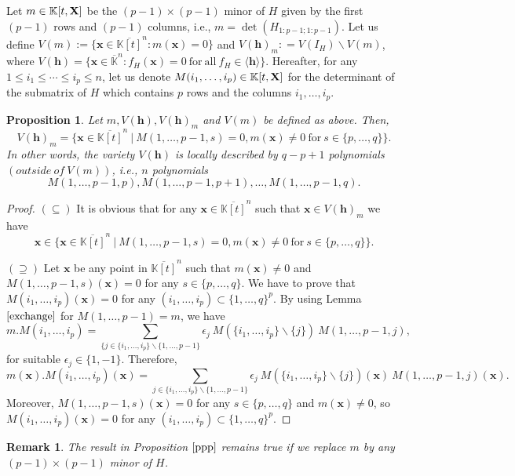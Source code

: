 \documentclass[11pt]{article}
\numberwithin{Property}{section}
\numberwithin{Theorem}{section}
\newtheorem{Proposition}{Proposition}%
\numberwithin{Proposition}{section}
\numberwithin{Lemma}{section}
\numberwithin{Corollary}{section}
\numberwithin{Definition}{section}
\newtheorem{Remark}{Remark}%
\numberwithin{Remark}{section}
\numberwithin{Conjecture}{section}
\numberwithin{Problem}{section}
\numberwithin{Claim}{section}
\theoremstyle{definition}
\numberwithin{Example}{section}
\def\h {\ensuremath{\mathbf{h}}}
\renewcommand{\leq}{\leqslant}
\def\bar{\overline}
\newcommand{\field}{\mathbb{K}} %
\newcommand{\mat}[1]{\mathbf{\MakeUppercase{#1}}} %
\begin{document}
Let $m \in \field[t,\mat{X}]$ be the $(p-1) \times (p-1)$ minor of $H$ given by the first $(p-1)$ rows and $(p-1)$ columns, i.e., $m = \det(H_{1:p-1;1:p-1})$. Let us define $V(m) := \{\mathbf{x} \in \bar{\field[t]}^n : m(\mathbf{x}) = 0\}$ and $V(\h)_m : = V(I_H) \backslash V(m)$, where $V(\h) = \{\mathbf{x} \in \bar{\field}^{n} : f_H(\mathbf{x}) = 0 \ \mathrm{for \ all} \ f_H \in \langle \h \rangle \}$. Hereafter, for any $1 \leq i_1 \leq \cdots \leq i_p \leq n$, let us denote $M(i_1, \ldots, i_p) \in \field[t,\mat{X}]$ for the determinant of the submatrix of $H$ which contains $p$ rows and the columns $i_1, \ldots, i_p$. 
\begin{Proposition} \label{ppp} Let $m, V(\h), V(\h)_m$ and $V(m)$ be defined as above. Then, 
\[
V(\h)_m = \{\mathbf{x} \in \bar{\field[t]}^n \ | \ M(1, \ldots, p-1, s) = 0, m(\mathbf{x}) \ne 0 \ \mathrm{for} \ s \in \{p, \ldots, q\} \}.
\] In other words, the variety $V(\h)$ is locally described by $q - p + 1$ polynomials $(outside \ of \ V(m))$, i.e., $n$ polynomials 
\[
M(1, \ldots, p-1, p), M(1, \ldots, p-1, p+	1), \ldots, M(1, \ldots, p-1, q).
\]
\end{Proposition}
\begin{proof}
$(\subseteq)$ It is obvious that for any $\mathbf{x} \in \bar{\field[t]}^n$ such that $\mathbf{x} \in V(\h)_m$ we have 
\[\mathbf{x} \in \{\mathbf{x} \in \bar{\field[t]}^n \ | \ M(1, \ldots, p-1, s) = 0, m(\mathbf{x}) \ne 0 \ \mathrm{for} \ s \in \{p, \ldots, q\} \}.\]

$(\supseteq)$ Let $\mathbf{x}$ be any point in $\bar{\field[t]}^n$ such that $m(\mathbf{x}) \ne 0$ and $M(1, \ldots, p-1, s)(\mathbf{x}) = 0$ for any $s \in \{p, \ldots, q\}$. We have to prove that $M(i_1, \ldots, i_p)(\mathbf{x}) = 0$ for any $(i_1, \ldots, i_p) \subset \{1, \ldots, q\}^p$. By using Lemma $\ref{exchange}$ for $M(1, \ldots, p-1) = m$, we have 
\[
m.M(i_1, \ldots, i_p) = \sum_{\{j \in \{i_1, \ldots, i_p\} \backslash \{1, \ldots, p-1 \} } \epsilon_j \ M(\{i_1, \ldots, i_p\} \backslash \{j\}) \ M(1, \ldots, p-1,j),
\] for suitable $\epsilon_j \in \{1,-1\}$. Therefore, 
\[
m(\mathbf{x}).M(i_1, \ldots, i_p)(\mathbf{x}) = \sum_{j \in \{i_1, \ldots, i_p\} \backslash \{1, \ldots, p-1 \} } \epsilon_j \ M(\{i_1, \ldots, i_p\} \backslash \{j\})(\mathbf{x}) \ M(1, \ldots, p-1,j)(\mathbf{x}). 
\] Moreover, $M(1, \ldots, p-1, s)(\mathbf{x}) = 0$ for any $s \in \{p, \ldots, q\}$ and $m(\mathbf{x}) \ne 0$, so $M(i_1, \ldots, i_p)(\mathbf{x}) = 0$ for any $(i_1, \ldots, i_p) \subset \{1, \ldots, q\}^p$. 
\end{proof}
\begin{Remark}The result in Proposition $\ref{ppp}$ remains true if we replace $m$ by any $(p-1) \times (p-1)$ minor of $H$. 
\end{Remark}
\end{document}
